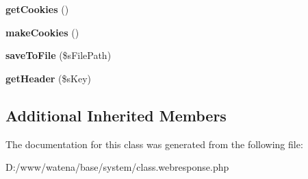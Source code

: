 \begin{DoxyCompactItemize}
\item 
\hypertarget{class_web_response_aa4fd38a916880c1013d33e704f61c033}{{\bfseries get\-Cookies} ()}\label{class_web_response_aa4fd38a916880c1013d33e704f61c033}

\item 
\hypertarget{class_web_response_a7a4e8eb92232f8f479fd031e831ce7da}{{\bfseries make\-Cookies} ()}\label{class_web_response_a7a4e8eb92232f8f479fd031e831ce7da}

\item 
\hypertarget{class_web_response_af6acf529bbc965ebb78a5633b73dc697}{{\bfseries save\-To\-File} (\$s\-File\-Path)}\label{class_web_response_af6acf529bbc965ebb78a5633b73dc697}

\item 
\hypertarget{class_web_response_adf4310960ba630045e4d09d78952848e}{{\bfseries get\-Header} (\$s\-Key)}\label{class_web_response_adf4310960ba630045e4d09d78952848e}

\end{DoxyCompactItemize}
\subsection*{Additional Inherited Members}


The documentation for this class was generated from the following file\-:\begin{DoxyCompactItemize}
\item 
D\-:/www/watena/base/system/class.\-webresponse.\-php\end{DoxyCompactItemize}
